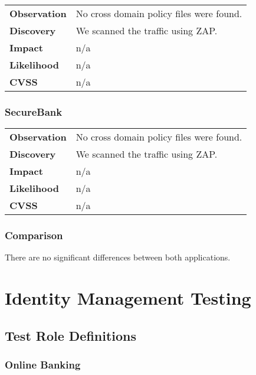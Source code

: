 \begin{tabular}{l|p{10cm}}

\textbf{Observation} & No cross domain policy files were found.  \\
\textbf{Discovery} & We scanned the traffic using ZAP. \\
\textbf{Impact} & n/a \\
\textbf{Likelihood} & n/a \\
\textbf{CVSS} & n/a \\
\end{tabular}

\subsubsection*{SecureBank}

\begin{tabular}{l|p{10cm}}

\textbf{Observation} & No cross domain policy files were found.  \\
\textbf{Discovery} & We scanned the traffic using ZAP. \\
\textbf{Impact} & n/a \\
\textbf{Likelihood} & n/a \\
\textbf{CVSS} & n/a \\
\end{tabular}

\subsubsection*{Comparison}
There are no significant differences between both applications.

\clearpage

\section{Identity Management Testing}

\subsection{Test Role Definitions}

\subsubsection*{Online Banking}

